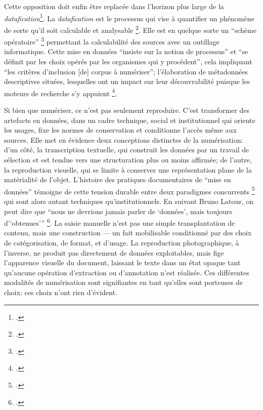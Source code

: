 Cette opposition doit enfin être replacée dans l’horizon plus large de la \emph{datafication}\footcite[][]{clavert}. La \emph{datafication} est le processus qui vise à quantifier un phénomène de sorte qu'il soit calculable et analysable \footcite[][]{clavert}. Elle est en quelque sorte un \enquote{schème opératoire} \footcite[][p. 236]{meot} permettant la calculabilité des sources avec un outillage informatique. Cette mise en données \enquote{insiste sur la notion de processus} et \enquote{se définit par les choix opérés par les organismes qui y procèdent}, cela impliquant \enquote{les critères d'inclusion [de] corpus à numériser}; l'élaboration de métadonnées descriptives situées, lesquelles ont un impact sur leur découvrabilité puisque les moteurs de recherche s'y appuient \footcite[][p. 123]{clavert}.

Si bien que numériser, ce n’est pas seulement reproduire. C’est transformer des artefacts en données, dans un cadre technique, social et institutionnel qui oriente les usages, fixe les normes de conservation et conditionne l’accès même aux sources. Elle met en évidence deux conceptions distinctes de la numérisation: d’un côté, la transcription textuelle, qui construit les données par un travail de sélection et est tendue vers une structuration plus ou moins affirmée; de l’autre, la reproduction visuelle, qui se limite à conserver une représentation plane de la matérialité de l’objet. L’histoire des pratiques documentaires de \enquote{mise en données} témoigne de cette tension durable entre deux paradigmes concurrents \footcite[][p. 29]{bermesbook} qui sont alors autant techniques qu'institutionnels. En suivant Bruno Latour, on peut dire que \enquote{nous ne devrions jamais parler de ‘données’, mais toujours d'‘obtenues’} \footcite[][]{goeta}. La saisie manuelle n'est pas une simple transplantation de contenu, mais une construction — un fait mobilisable conditionné par des choix de catégorisation, de format, et d’usage. La reproduction photographique, à l’inverse, ne produit pas directement de données exploitables, mais fige l’apparence visuelle du document, laissant le texte dans un état opaque tant qu’aucune opération d’extraction ou d’annotation n’est réalisée. Ces différentes modalités de numérisation sont signifiantes en tant qu'elles sont porteuses de choix; ces choix n'ont rien d'évident.

